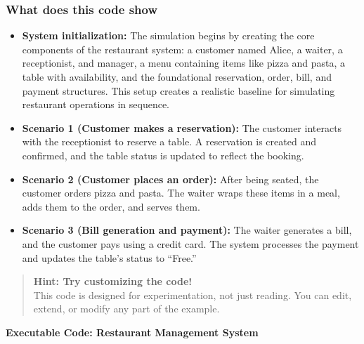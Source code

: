 \subsubsection{What does this code show}\label{e3I-15Ri4cgG6K0iV6u8u}

\begin{itemize}
\item
\protect{}\label{dzotZIkAmyhMUtnijVbn8}
\textbf{System initialization:} The simulation begins by creating the core components of the restaurant system: a customer named Alice, a waiter, a receptionist, and manager, a menu containing items like pizza and pasta, a table with availability, and the foundational reservation, order, bill, and payment structures. This setup creates a realistic baseline for simulating restaurant operations in sequence.
\item
\protect{}\label{9M1TR9AcricUzaXYVFHNN}
\textbf{Scenario 1 (Customer makes a reservation):} The customer interacts with the receptionist to reserve a table. A reservation is created and confirmed, and the table status is updated to reflect the booking.
\item
\protect{}\label{1QG5Rau_heRinVYV1ery-}
\textbf{Scenario 2 (Customer places an order):} After being seated, the customer orders pizza and pasta. The waiter wraps these items in a meal, adds them to the order, and serves them.
\item
\protect{}\label{jdWMnTyAq1LkGGb1m5iJK}
\textbf{Scenario 3 (Bill generation and payment):} The waiter generates a bill, and the customer pays using a credit card. The system processes the payment and updates the table's status to ``Free.''
\end{itemize}
\begin{quote}
\textbf{Hint: Try customizing the code!}
\\
This code is designed for experimentation, not just reading. You can edit, extend, or modify any part of the example.
\end{quote}

\textbf{Executable Code: Restaurant Management System}

